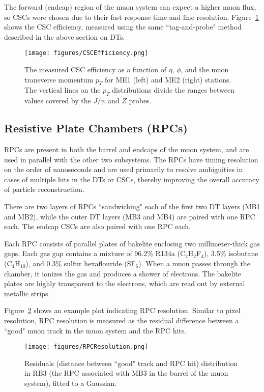 The forward (endcap) region of the muon system can expect a higher muon flux, so CSCs were chosen due to their fast response time and fine resolution. Figure~\ref{fig:CSCEfficiency} shows the CSC efficiency, measured using the same ``tag-and-probe" method described in the above section on DTs.

\begin{figure}\centering
  \texttt{[image: figures/CSCEfficiency.png]}
  \caption{\label{fig:CSCEfficiency} The measured CSC efficiency as a function of $\eta$, $\phi$, and the muon transverse momentum $p_T$ for ME1 (left) and ME2 (right) stations. The vertical lines on the $p_T$ distributions divide the ranges between values covered by the $J/\psi$ and $Z$ probes.}
\end{figure}

\subsection{Resistive Plate Chambers (RPCs)}

RPCs are present in both the barrel and endcaps of the muon system, and are used in parallel with the other two subsystems. The RPCs have timing resolution on the order of nanoseconds and are used primarily to resolve ambiguities in cases of multiple hits in the DTs or CSCs, thereby improving the overall accuracy of particle reconstruction.

There are two layers of RPCs ``sandwiching" each of the first two DT layers (MB1 and MB2), while the outer DT layers (MB3 and MB4) are paired with one RPC each. The endcap CSCs are also paired with one RPC each. 

Each RPC consists of parallel plates of bakelite enclosing two millimeter-thick gas gaps. Each gas gap contains a mixture of 96.2\% R134a (C$_2$H$_2$F$_4$), 3.5\% isobutane (C$_4$H$_10$), and 0.3\% sulfur hexaflouride (SF$_6$). When a muon passes through the chamber, it ionizes the gas and produces a shower of electrons. The bakelite plates are highly transparent to the electrons, which are read out by external metallic strips.

Figure~\ref{fig:RPCResolution} shows an example plot indicating RPC resolution. Similar to pixel resolution, RPC resolution is measured as the residual difference between a ``good" muon track in the muon system and the RPC hits.\cite{Muon}

\begin{figure}\centering
  \texttt{[image: figures/RPCResolution.png]}
  \caption{\label{fig:RPCResolution} Residuals (distance between ``good" track and RPC hit) distribution in RB3 (the RPC associated with MB3 in the barrel of the muon system), fitted to a Gaussian.}
\end{figure}


